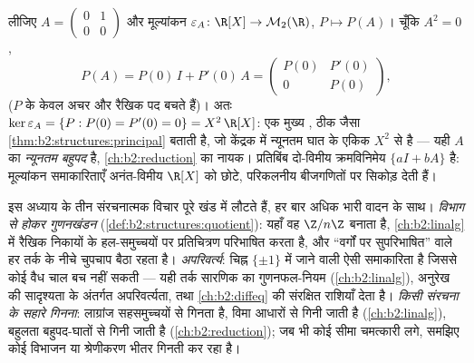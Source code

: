 \begin{example}[एक मूल्यांकन समाकारिता और उसका केंद्रक]\label{ex:b2:structures:evaluation}
लीजिए $A = \begin{pmatrix}0 & 1\\ 0 & 0\end{pmatrix}$ और मूल्यांकन $\varepsilon_A \colon \R[X] \to \mathcal{M}_2(\R)$, $P \mapsto P(A)$। चूँकि $A^2 = 0$,
\[
P(A) = P(0)\,I + P'(0)\,A =
\begin{pmatrix} P(0) & P'(0)\\ 0 & P(0)\end{pmatrix},
\]
($P$ के केवल अचर और रैखिक पद बचते हैं)। अतः $\ker\varepsilon_A = \{P : P(0) = P'(0) = 0\} = X^2\,\R[X]$: एक मुख्य ,
ठीक जैसा \cref{thm:b2:structures:principal} बताती है, जो केंद्रक में न्यूनतम घात के एकिक $X^2$ से 
है --- यही $A$ का \emph{न्यूनतम बहुपद} है, \cref{ch:b2:reduction} का नायक। प्रतिबिंब
दो-विमीय क्रमविनिमेय  $\{aI + bA\}$ है: मूल्यांकन समाकारिताएँ
अनंत-विमीय $\R[X]$ को छोटे, परिकलनीय बीजगणितों पर सिकोड़ देती हैं।
\end{example}

\begin{remark}[परिप्रेक्ष्य: सुनने योग्य तीन स्वरलहरियाँ]\label{rem:b2:structures:perspectives}
इस अध्याय के तीन संरचनात्मक विचार पूरे खंड में लौटते हैं, हर बार अधिक
भारी वादन के साथ। \emph{विभाग से होकर गुणनखंडन} (\cref{def:b2:structures:quotient}): यहाँ वह $\Z/n\Z$
बनाता है, \cref{ch:b2:linalg} में रैखिक निकायों के हल-समुच्चयों पर प्रतिचित्रण
परिभाषित करता है, और ``वर्गों पर सुपरिभाषित'' वाले हर तर्क के नीचे
चुपचाप बैठा रहता है। \emph{अपरिवर्त्य}: चिह्न $\{\pm1\}$ में जाने वाली ऐसी
समाकारिता है जिससे कोई वैध चाल बच नहीं सकती --- यही तर्क सारणिक का
गुणनफल-नियम (\cref{ch:b2:linalg}), अनुरेख की सादृश्यता के अंतर्गत अपरिवर्त्यता, तथा
\cref{ch:b2:diffeq} की संरक्षित राशियाँ देता है। \emph{किसी संरचना के सहारे गिनना}:
लाग्रांज सहसमुच्चयों से गिनता है, विमा आधारों से गिनी जाती है (\cref{ch:b2:linalg}),
बहुलता बहुपद-घातों से गिनी जाती है (\cref{ch:b2:reduction}); जब भी कोई सीमा चमत्कारी लगे,
समझिए कोई विभाजन या श्रेणीकरण भीतर गिनती कर रहा है।
\end{remark}

